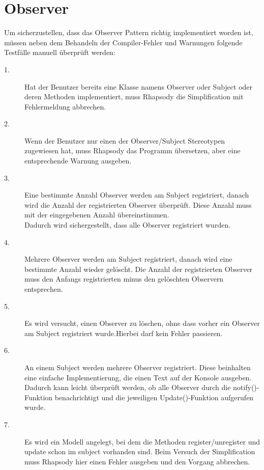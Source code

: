 \section{Observer}

Um sicherzustellen, dass das Observer Pattern richtig implementiert worden ist, müssen neben dem Behandeln der Compiler-Fehler und Warnungen folgende Testfälle manuell überprüft werden: 

\begin{description}

	\item[1.]
	Hat der Benutzer bereits eine Klasse namens Observer oder Subject oder deren Methoden implementiert, muss Rhapsody die Simplification mit Fehlermeldung abbrechen.
	
	\item[2.]
	Wenn der Benutzer nur einen der Observer/Subject Stereotypen zugewiesen hat, muss Rhapsody das Programm übersetzen, aber eine entsprechende Warnung ausgeben.
	
	\item[3.]
	Eine bestimmte Anzahl Observer werden am Subject registriert, danach wird die Anzahl der registrierten Observer überprüft. Diese Anzahl muss mit der eingegebenen Anzahl übereinstimmen. \\
	Dadurch wird sichergestellt, dass alle Observer registriert wurden.

	\item[4.]
	Mehrere Observer werden am Subject registriert, danach wird eine bestimmte Anzahl wieder gelöscht. Die Anzahl der registrierten Observer muss den Anfangs registrierten minus den gelöschten Observern entsprechen.
	
	\item[5.]
	Es wird versucht, einen Observer zu löschen, ohne dass vorher ein Observer am Subject registriert wurde.Hierbei darf kein Fehler passieren.
	 
	\item[6.]
	An einem Subject werden mehrere Observer registriert. Diese beinhalten eine einfache Implementierung, die einen Text auf der Konsole ausgeben. Dadurch kann leicht überprüft werden, ob alle Observer durch die notify()-Funktion benachrichtigt und die jeweiligen Update()-Funktion aufgerufen wurde.
	
	\item[7.]
	Es wird ein Modell angelegt, bei dem die Methoden register/unregister und update schon im subject vorhanden sind. Beim Versuch der Simplification muss Rhapsody hier einen Fehler ausgeben und den Vorgang abbrechen.
	

\end{description}
